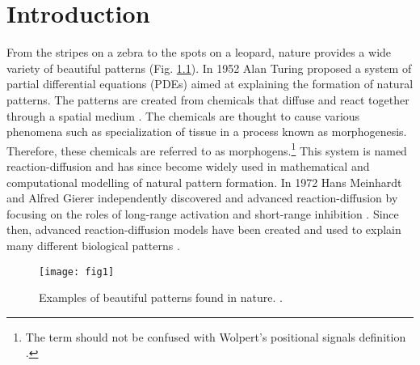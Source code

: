 \chapter{Introduction}
From the stripes on a zebra to the spots on a leopard, nature provides a wide variety of beautiful patterns (Fig. \ref{fig:naturalPatterns1}). In 1952 Alan Turing proposed a system of partial differential equations (PDEs) aimed at explaining the formation of natural patterns. The patterns are created from chemicals that diffuse and react together through a spatial medium \citep{turing1952}. The chemicals are thought to cause various phenomena such as specialization of tissue in a process known as morphogenesis. Therefore, these chemicals are referred to as morphogens.\footnote{The term  should not be confused with Wolpert's positional signals definition \citep{wolpert1996}.} This system is named reaction-diffusion and has since become widely used in mathematical and computational modelling of natural pattern formation. In 1972 Hans Meinhardt and Alfred Gierer independently discovered and advanced reaction-diffusion by focusing on the roles of long-range activation and short-range inhibition \citep{gierer1972}. Since then, advanced reaction-diffusion models have been created and used to explain many different biological patterns \citep{garzon2011, fowler1992, lefevre2010, meinhardt2009}.

\begin{figure}[H]
  \centering
  \texttt{[image: fig1]}
  \caption[Examples of beautiful patterns found in nature]{Examples of beautiful patterns found in nature. .}
  \label{fig:naturalPatterns1}
\end{figure}


